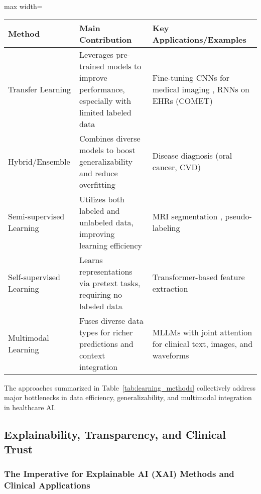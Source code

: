 \documentclass[sigconf]{acmart}
\begin{document}
\begin{table*}[htbp]
\centering
\caption{Overview of Learning Methods and Their Key Contributions in Healthcare}
\label{tab:learning_methods}
\begin{adjustbox}{max width=\textwidth}
\begin{tabular}{lll}
\toprule
\textbf{Method}      & \textbf{Main Contribution}                                        & \textbf{Key Applications/Examples} \\
\midrule
Transfer Learning    & Leverages pre-trained models to improve performance, especially with limited labeled data & Fine-tuning CNNs for medical imaging \cite{ref31, ref54, ref90}, RNNs on EHRs (COMET) \cite{ref49} \\
Hybrid/Ensemble      & Combines diverse models to boost generalizability and reduce overfitting                   & Disease diagnosis (oral cancer, CVD) \cite{ref53, ref71, ref90} \\
Semi-supervised Learning & Utilizes both labeled and unlabeled data, improving learning efficiency                  & MRI segmentation \cite{ref61, ref77}, pseudo-labeling \cite{ref76} \\
Self-supervised Learning & Learns representations via pretext tasks, requiring no labeled data                     & Transformer-based feature extraction \cite{ref41, ref55, ref106} \\
Multimodal Learning  & Fuses diverse data types for richer predictions and context integration                     & MLLMs with joint attention for clinical text, images, and waveforms \cite{ref31, ref49, ref76, ref106} \\
\bottomrule
\end{tabular}
\end{adjustbox}
\end{table*}

The approaches summarized in Table~\ref{tab:learning_methods} collectively address major bottlenecks in data efficiency, generalizability, and multimodal integration in healthcare AI.

\subsection{Explainability, Transparency, and Clinical Trust}

\subsubsection{The Imperative for Explainable AI (XAI) Methods and Clinical Applications}
\end{document}
